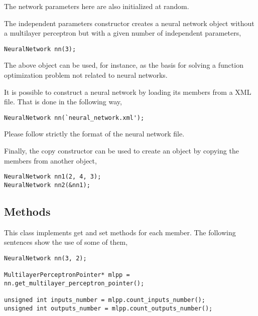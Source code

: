 The network parameters here are also initialized at random. 


The independent parameters constructor creates a neural network object without a multilayer perceptron but with a given number of independent parameters, 

\begin{lstlisting}
NeuralNetwork nn(3);
\end{lstlisting}

The above object can be used, for instance, as the basis for solving a function optimization problem not related to neural networks. 


It is possible to construct a neural network by loading its members from a XML file. 
That is done in the following way, 

\begin{lstlisting}
NeuralNetwork nn(`neural_network.xml');
\end{lstlisting}

Please follow strictly the format of the neural network file. 


Finally, the copy constructor can be used to create an object by copying the members from another object, 

\begin{lstlisting}
NeuralNetwork nn1(2, 4, 3);
NeuralNetwork nn2(&nn1);
\end{lstlisting}

\subsection*{Methods}

This class implements get and set methods for each member. 
The following sentences show the use of some of them,

\begin{lstlisting}
NeuralNetwork nn(3, 2);

MultilayerPerceptronPointer* mlpp = nn.get_multilayer_perceptron_pointer();

unsigned int inputs_number = mlpp.count_inputs_number();
unsigned int outputs_number = mlpp.count_outputs_number();

\end{lstlisting}



